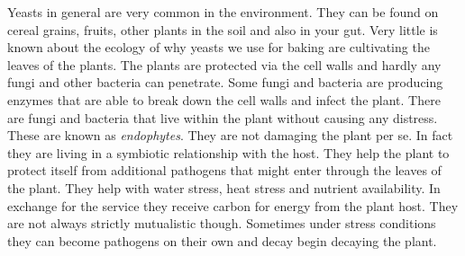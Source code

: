 Yeasts in general are very common in the environment.
They can be found on cereal grains, fruits, other plants
in the soil and also in your gut. Very little is known
about the ecology of why yeasts we use for baking
are cultivating the leaves of the plants. The plants
are protected via the cell walls and hardly any
fungi and other bacteria can penetrate. Some fungi and
bacteria are producing enzymes that are able
to break down the cell walls and infect the plant.
There are fungi and bacteria that live within the plant
without causing any distress. These are known as {\it endophytes}.
They are not damaging the plant per se. In fact they are
living in a symbiotic relationship with the host. They
help the plant to protect itself from additional pathogens
that might enter through the leaves of the plant. They
help with water stress, heat stress and nutrient availability. 
In exchange for the service they receive carbon for energy
from the plant host. They are not always strictly mutualistic though.
Sometimes under stress conditions they can become pathogens
on their own \cite{endophytes+in+plants} and decay begin
decaying the plant.

